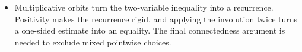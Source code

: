 \begin{takeaways}
\begin{itemize}
\item Multiplicative orbits turn the two-variable inequality into a recurrence.
Positivity makes the recurrence rigid, and applying the involution twice
turns a one-sided estimate into an equality. The final connectedness argument
is needed to exclude mixed pointwise choices.
\end{itemize}
\end{takeaways}
